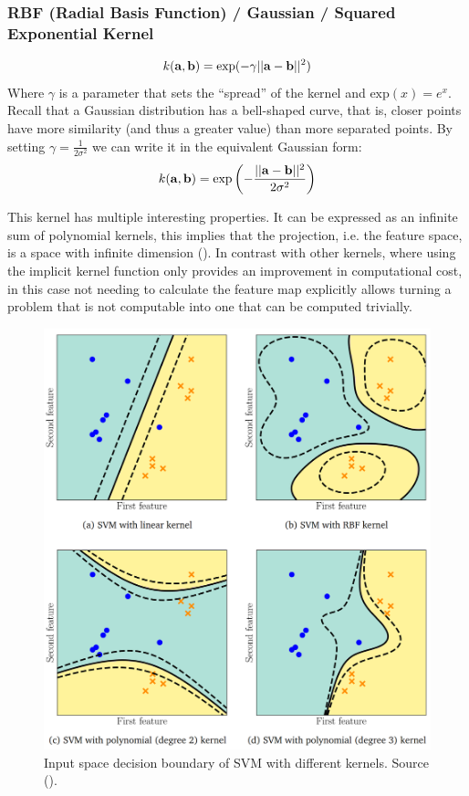 \subsubsection*{RBF (Radial Basis Function) / Gaussian / Squared Exponential Kernel}
\begin{align}
    k(\mathbf{a}, \mathbf{b}) = \text{exp}(-\gamma ||\mathbf{a} - \mathbf{b}||^2)
\end{align}
Where $\gamma$ is a parameter that sets the “spread” of the kernel and $\text{exp}(x) = e^x$. Recall that a Gaussian distribution has a bell-shaped curve, that is, closer points have more similarity (and thus a greater value) than more separated points. By setting $\gamma = \frac{1}{2\sigma^2}$ we can write it in the equivalent Gaussian form:
\begin{align}
    k(\mathbf{a}, \mathbf{b}) = \text{exp}\left(-\frac{||\mathbf{a} - \mathbf{b}||^2}{2\sigma^2}\right)
\end{align}

This kernel has multiple interesting properties. It can be expressed as an infinite sum of polynomial kernels, this implies that the projection, i.e. the feature space, is a space with infinite dimension (\cite{bernstein_radial_2017}). In contrast with other kernels, where using the implicit kernel function only provides an improvement in com\-pu\-ta\-tion\-al cost, in this case not needing to calculate the feature map explicitly allows turning a problem that is not computable into one that can be computed trivially.

\begin{figure}[h]
    \centering
    \includegraphics[width=0.7\linewidth]{img/ch4/kernels.png}
    \caption{Input space decision boundary of SVM with different kernels. Source (\cite{deisenroth_mathematics_2020}).}
    \label{fig:ch4.kernels}
\end{figure}


